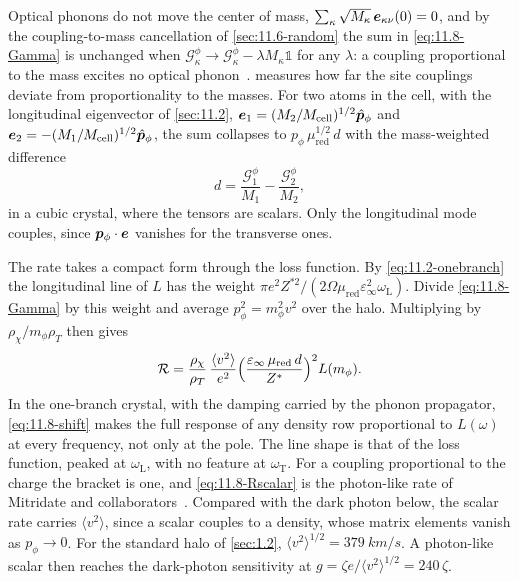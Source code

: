 Optical phonons do not move the center of mass, $\sum_\kappa\sqrt{M_\kappa}\,\bm{e}_{\kappa\nu}(0) = 0$, and by the coupling-to-mass cancellation of \cref{sec:11.6-random} the sum in \cref{eq:11.8-Gamma} is unchanged when $\mathcal{G}^\phi_\kappa \to \mathcal{G}^\phi_\kappa - \lambda M_\kappa\mathbb{1}$ for any $\lambda$: a coupling proportional to the mass excites no optical phonon~\cite[Eq.~(44)]{mitridate2024effective}.  measures how far the site couplings deviate from proportionality to the masses. For two atoms in the cell, with the longitudinal eigenvector of \cref{sec:11.2}, $\bm{e}_1 = (M_2/M_{\mathrm{cell}})^{1/2}\hat{\bm{p}}_\phi$ and $\bm{e}_2 = -(M_1/M_{\mathrm{cell}})^{1/2}\hat{\bm{p}}_\phi$, the sum collapses to $p_\phi\,\mu_{\mathrm{red}}^{1/2}\,d$ with the mass-weighted difference
\begin{equation}
  d = \frac{\mathcal{G}^\phi_1}{M_1} - \frac{\mathcal{G}^\phi_2}{M_2} ,
  \label{eq:11.8-d}
\end{equation}
in a cubic crystal, where the tensors are scalars. Only the longitudinal mode couples, since $\bm{p}_\phi\cdot\bm{e}$ vanishes for the transverse ones.

The rate takes a compact form through the loss function. By \cref{eq:11.2-onebranch} the longitudinal line of $L$ has the weight $\pi e^2Z^{*2}/(2\Omega\mu_{\mathrm{red}}\varepsilon_\infty^2\omega_{\mathrm{L}})$. Divide \cref{eq:11.8-Gamma} by this weight and average $p_\phi^2 = m_\phi^2v^2$ over the halo. Multiplying by $\rho_\chi/m_\phi\rho_T$ then gives
\begin{equation}
  \mathcal{R} = \frac{\rho_\chi}{\rho_T}\,\frac{\langle v^2\rangle}{e^2}\Bigl(\frac{\varepsilon_\infty\,\mu_{\mathrm{red}}\,d}{Z^*}\Bigr)^2L(m_\phi) .
  \label{eq:11.8-Rscalar}
\end{equation}
In the one-branch crystal, with the damping carried by the phonon propagator, \cref{eq:11.8-shift} makes the full response of any density row proportional to $L(\omega)$ at every frequency, not only at the pole. The line shape is that of the loss function, peaked at $\omega_{\mathrm{L}}$, with no feature at $\omega_{\mathrm{T}}$. For a coupling proportional to the charge the bracket is one, and \cref{eq:11.8-Rscalar} is the photon-like rate of Mitridate and collaborators~\cite[Eq.~(42)]{mitridate2024effective}. Compared with the dark photon below, the scalar rate carries $\langle v^2\rangle$, since a scalar couples to a density, whose matrix elements vanish as $p_\phi \to 0$. For the standard halo of \cref{sec:1.2}, $\langle v^2\rangle^{1/2} = \SI{379}{km/s}$. A photon-like scalar then reaches the dark-photon sensitivity at $g = \zeta e/\langle v^2\rangle^{1/2} = 240\,\zeta$.

